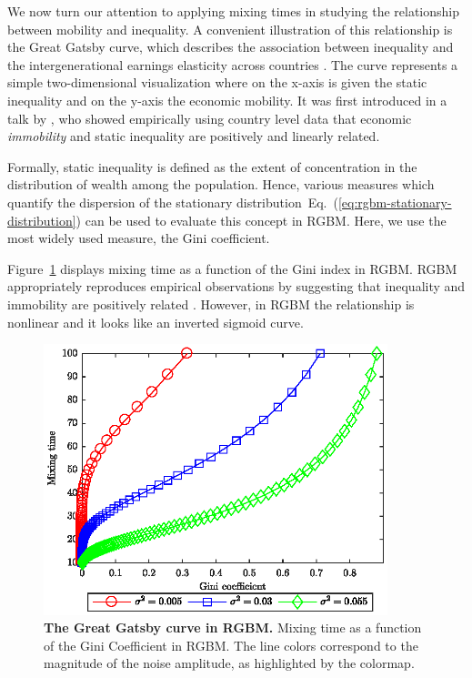 \documentclass[11pt]{article}
\newcommand{\eref}[1]{Eq.~(\ref{eq:#1})}
\newcommand{\Fref}[1]{Figure~\ref{fig:#1}}
\newcommand{\be}{\begin{equation}}
\newcommand{\ee}{\end{equation}}
\numberwithin{equation}{section}
\begin{document}
We now turn our attention to applying mixing times in studying the relationship between mobility and inequality. A convenient illustration of this relationship is the Great Gatsby curve, which describes the association between inequality and the intergenerational earnings elasticity across countries \citep{krueger2012,corak2013}. The curve represents a simple two-dimensional visualization where on the x-axis is given the static inequality and on the y-axis the economic mobility. It was first introduced in a talk by \citet{krueger2012}, who showed empirically using country level data that economic \textit{immobility} and static inequality are positively and linearly related.

Formally, static inequality is defined as the extent of concentration in the distribution of wealth among the population. Hence, various measures which quantify the dispersion of the stationary distribution~\eref{rgbm-stationary-distribution} can be used to evaluate this concept in RGBM. Here, we use the most widely used measure, the Gini coefficient.

\Fref{rgbm-great-gatsby} displays mixing time as a function of the Gini index in RGBM. RGBM appropriately reproduces empirical observations by suggesting that inequality and immobility are positively related \citep{krueger2012}. However, in RGBM the relationship is nonlinear and it looks like an inverted sigmoid curve.

\begin{figure}[!htb]
\centering
\includegraphics[width=10cm]{figs/fig_great_gatsby.eps}
\caption{\textbf{The Great Gatsby curve in RGBM.} Mixing time as a function of the Gini Coefficient in RGBM. The line colors correspond to the magnitude of the noise amplitude, as highlighted by the colormap.
\label{fig:rgbm-great-gatsby}}
\end{figure}
\FloatBarrier
\end{document}
